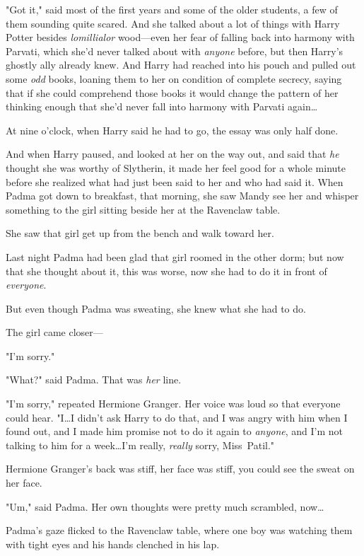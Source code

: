 "Got it," said most of the first years and some of the older students, a few of
them sounding quite scared.
\later
And she talked about a lot of things with Harry Potter besides
\emph{lomillialor} wood—even her fear of falling back into harmony with
Parvati, which she’d never talked about with \emph{anyone} before, but then
Harry’s ghostly ally already knew. And Harry had reached into his pouch and
pulled out some \emph{odd} books, loaning them to her on condition of complete
secrecy, saying that if she could comprehend those books it would change the
pattern of her thinking enough that she’d never fall into harmony with Parvati
again…

At nine o’clock, when Harry said he had to go, the essay was only half done.

And when Harry paused, and looked at her on the way out, and said that
\emph{he} thought she was worthy of Slytherin, it made her feel good for a
whole minute before she realized what had just been said to her and who had
said it.
\later
When Padma got down to breakfast, that morning, she saw Mandy see her and
whisper something to the girl sitting beside her at the Ravenclaw table.

She saw that girl get up from the bench and walk toward her.

Last night Padma had been glad that girl roomed in the other dorm; but now that
she thought about it, this was worse, now she had to do it in front of
\emph{everyone}.

But even though Padma was sweating, she knew what she had to do.

The girl came closer—

"I’m sorry."

"What?" said Padma. That was \emph{her} line.

"I’m sorry," repeated Hermione Granger. Her voice was loud so that everyone
could hear. "I…I didn’t ask Harry to do that, and I was angry with him
when I found out, and I made him promise not to do it again to \emph{anyone},
and I’m not talking to him for a week…I’m really, \emph{really} sorry,
Miss~Patil."

Hermione Granger’s back was stiff, her face was stiff, you could see the sweat
on her face.

"Um," said Padma. Her own thoughts were pretty much scrambled, now…

Padma’s gaze flicked to the Ravenclaw table, where one boy was watching them
with tight eyes and his hands clenched in his lap.

